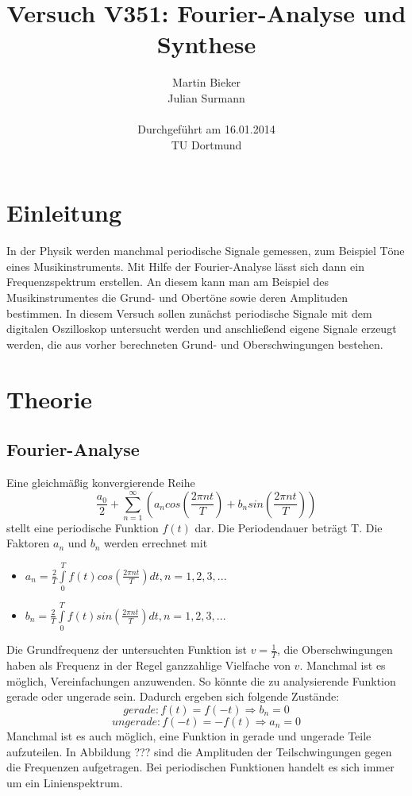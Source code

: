 \documentclass[11pt,ngerman,a4paper]{article}
\title{\textbf{Versuch V351: Fourier-Analyse und Synthese}}
\author{Martin Bieker\\
		Julian Surmann\\
		\\
		Durchgef\"{u}hrt am 16.01.2014\\
		TU Dortmund}
\date{}
\begin{document}
\renewcommand\tablename{Tabelle}
\renewcommand\figurename{Abbildung}
\maketitle
\thispagestyle{empty}
\newpage
\clearpage
\setcounter{page}{1}


\section{Einleitung}
In der Physik werden manchmal periodische Signale gemessen, zum Beispiel Töne eines Musikinstruments. Mit Hilfe der Fourier-Analyse lässt sich dann ein Frequenzspektrum erstellen. An diesem kann man am Beispiel des Musikinstrumentes die Grund- und Obertöne sowie deren Amplituden bestimmen.
In diesem Versuch sollen zunächst periodische Signale mit dem digitalen Oszilloskop untersucht werden und anschließend eigene Signale erzeugt werden, die aus vorher berechneten Grund- und Oberschwingungen bestehen.
\section{Theorie}
\subsection{Fourier-Analyse}
Eine gleichmäßig konvergierende Reihe
\begin{equation}
\frac{a_0}{2}+\sum_{n=1}^\infty \left(a_ncos\left(\frac{2\pi nt}{T}\right)+b_nsin\left(\frac{2\pi nt}{T}\right)\right)
\label{formel1}
\end{equation}
stellt eine periodische Funktion $f(t)$ dar. Die Periodendauer beträgt T. Die Faktoren $a_n$ und $b_n$ werden errechnet mit
\begin{itemize}
\item $a_n=\frac{2}{T}\int\limits_{0}^{T}f(t)cos\left(\frac{2\pi nt}{T}\right)dt , n = 1,2,3,... $
\item $b_n=\frac{2}{T}\int\limits_{0}^{T}f(t)sin\left(\frac{2\pi nt}{T}\right)dt , n = 1,2,3,... $
\end{itemize}
Die Grundfrequenz der untersuchten Funktion ist $v=\frac{1}{T}$, die Oberschwingungen haben als Frequenz in der Regel ganzzahlige Vielfache von $v$.
Manchmal ist es möglich, Vereinfachungen anzuwenden. So könnte die zu analysierende Funktion gerade oder ungerade sein. Dadurch ergeben sich folgende Zustände:
\begin{equation}
gerade: f(t)=f(-t) \Rightarrow b_n=0
\end{equation}
\begin{equation}
ungerade: f(-t)=-f(t) \Rightarrow a_n=0
\end{equation}
Manchmal ist es auch möglich, eine Funktion in gerade und ungerade Teile aufzuteilen. In Abbildung ??? sind die Amplituden der Teilschwingungen gegen die Frequenzen aufgetragen. Bei periodischen Funktionen handelt es sich immer um ein Linienspektrum.
\end{document}
